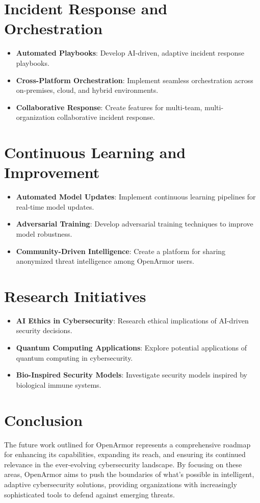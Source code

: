 \section{Incident Response and Orchestration}
\begin{itemize}
    \item \textbf{Automated Playbooks}: Develop AI-driven, adaptive incident response playbooks.
    \item \textbf{Cross-Platform Orchestration}: Implement seamless orchestration across on-premises, cloud, and hybrid environments.
    \item \textbf{Collaborative Response}: Create features for multi-team, multi-organization collaborative incident response.
\end{itemize}

\section{Continuous Learning and Improvement}
\begin{itemize}
    \item \textbf{Automated Model Updates}: Implement continuous learning pipelines for real-time model updates.
    \item \textbf{Adversarial Training}: Develop adversarial training techniques to improve model robustness.
    \item \textbf{Community-Driven Intelligence}: Create a platform for sharing anonymized threat intelligence among OpenArmor users.
\end{itemize}

\section{Research Initiatives}
\begin{itemize}
    \item \textbf{AI Ethics in Cybersecurity}: Research ethical implications of AI-driven security decisions.
    \item \textbf{Quantum Computing Applications}: Explore potential applications of quantum computing in cybersecurity.
    \item \textbf{Bio-Inspired Security Models}: Investigate security models inspired by biological immune systems.
\end{itemize}

\section{Conclusion}
The future work outlined for OpenArmor represents a comprehensive roadmap for enhancing its capabilities, expanding its reach, and ensuring its continued relevance in the ever-evolving cybersecurity landscape. By focusing on these areas, OpenArmor aims to push the boundaries of what's possible in intelligent, adaptive cybersecurity solutions, providing organizations with increasingly sophisticated tools to defend against emerging threats.

